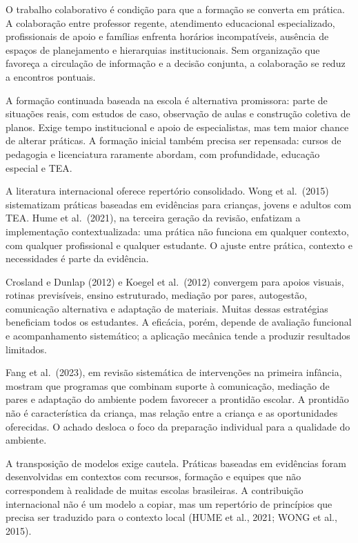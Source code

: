 O trabalho colaborativo é condição para que a formação se converta em
prática. A colaboração entre professor regente, atendimento educacional
especializado, profissionais de apoio e famílias enfrenta horários
incompatíveis, ausência de espaços de planejamento e hierarquias
institucionais. Sem organização que favoreça a circulação de informação
e a decisão conjunta, a colaboração se reduz a encontros pontuais.

A formação continuada baseada na escola é alternativa promissora: parte
de situações reais, com estudos de caso, observação de aulas e
construção coletiva de planos. Exige tempo institucional e apoio de
especialistas, mas tem maior chance de alterar práticas. A formação
inicial também precisa ser repensada: cursos de pedagogia e licenciatura
raramente abordam, com profundidade, educação especial e TEA.

A literatura internacional oferece repertório consolidado. Wong et
al.~(2015) sistematizam práticas baseadas em evidências para crianças,
jovens e adultos com TEA. Hume et al.~(2021), na terceira geração da
revisão, enfatizam a implementação contextualizada: uma prática não
funciona em qualquer contexto, com qualquer profissional e qualquer
estudante. O ajuste entre prática, contexto e necessidades é parte da
evidência.

Crosland e Dunlap (2012) e Koegel et al.~(2012) convergem para apoios
visuais, rotinas previsíveis, ensino estruturado, mediação por pares,
autogestão, comunicação alternativa e adaptação de materiais. Muitas
dessas estratégias beneficiam todos os estudantes. A eficácia, porém,
depende de avaliação funcional e acompanhamento sistemático; a aplicação
mecânica tende a produzir resultados limitados.

Fang et al.~(2023), em revisão sistemática de intervenções na primeira
infância, mostram que programas que combinam suporte à comunicação,
mediação de pares e adaptação do ambiente podem favorecer a prontidão
escolar. A prontidão não é característica da criança, mas relação entre
a criança e as oportunidades oferecidas. O achado desloca o foco da
preparação individual para a qualidade do ambiente.

A transposição de modelos exige cautela. Práticas baseadas em evidências
foram desenvolvidas em contextos com recursos, formação e equipes que
não correspondem à realidade de muitas escolas brasileiras. A
contribuição internacional não é um modelo a copiar, mas um repertório
de princípios que precisa ser traduzido para o contexto local (HUME et
al., 2021; WONG et al., 2015).

